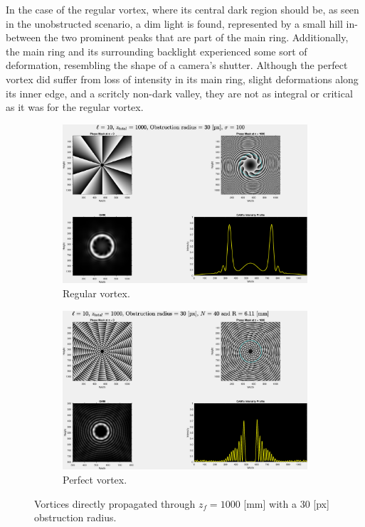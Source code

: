 In the case of the regular vortex, where its central dark region should be, as seen in the unobstructed scenario, a dim light is found, represented by a small hill in-between the two prominent peaks that are part of the main ring. Additionally, the main ring and its surrounding backlight experienced some sort of deformation, resembling the shape of a camera's shutter. Although the perfect vortex did suffer from loss of intensity in its main ring, slight deformations along its inner edge, and a scritcly non-dark valley, they are not as integral or critical as it was for the regular vortex. 

\begin{figure}[htbp]
    \centering
    \begin{subfigure}[b]{0.45\textwidth}
        \centering
        \includegraphics[width=\textwidth]{images/c04/type=0_r=30_zi=0_zf=1000.eps}
        \caption{Regular vortex.}
    \end{subfigure}
    \hfill
    \begin{subfigure}[b]{0.45\textwidth}
        \centering
        \includegraphics[width=\textwidth]{images/c04/type=1_r=30_zi=0_zf=1000.eps}
        \caption{Perfect vortex.}
    \end{subfigure}
    \caption{Vortices directly propagated through $z_f = 1000$ [mm] with a 30 [px] obstruction radius.}
    \label{fig:Vortices_r=30_z=1000}
\end{figure}

